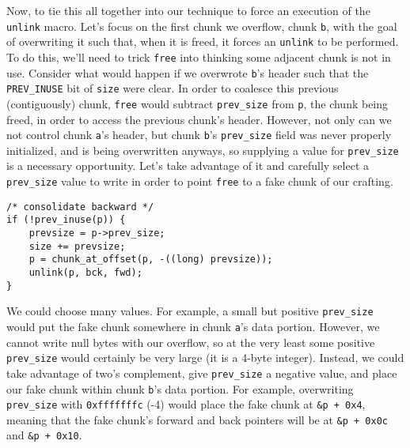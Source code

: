 Now, to tie this all together into our technique to force an execution
of the \texttt{unlink} macro. Let's focus on the first chunk we overflow,
chunk \texttt{b}, with the goal of overwriting it such that, when it is
freed, it forces an \texttt{unlink} to be performed. To do this, we'll
need to trick \texttt{free} into thinking some adjacent chunk is
not in use. Consider what would happen if we overwrote \texttt{b}'s
header such that the \texttt{PREV\_INUSE} bit of \texttt{size}
were clear. In order to coalesce this previous (contiguously) chunk,
\texttt{free} would subtract \texttt{prev\_size} from \texttt{p},
the chunk being freed, in order to access the previous chunk's header.
However, not only can we not control chunk \texttt{a}'s header, but
chunk \texttt{b}'s \texttt{prev\_size} field was never properly
initialized, and is being overwritten anyways, so supplying a
value for \texttt{prev\_size} is a necessary opportunity. Let's
take advantage of it and carefully select a \texttt{prev\_size}
value to write in order to point \texttt{free} to a fake chunk of
our crafting.

\begin{lstlisting}
/* consolidate backward */
if (!prev_inuse(p)) {
	prevsize = p->prev_size;
	size += prevsize;
	p = chunk_at_offset(p, -((long) prevsize));
	unlink(p, bck, fwd);
}
\end{lstlisting}

We could choose many values. For example, a small but positive \texttt{prev\_size}
would put the fake chunk somewhere in chunk \texttt{a}'s data portion.
However, we cannot write null bytes with our overflow, so at the very least
some positive \texttt{prev\_size} would certainly be very large (it is a 4-byte integer).
Instead, we could take advantage of two's complement, give \texttt{prev\_size} a negative value, and place our
fake chunk within chunk \texttt{b}'s data portion. For example,
overwriting \texttt{prev\_size} with \texttt{0xfffffffc} (-4) would
place the fake chunk at \texttt{\&p + 0x4}, meaning that the fake chunk's
forward and back pointers will be at \texttt{\&p + 0x0c} and \texttt{\&p + 0x10}.

